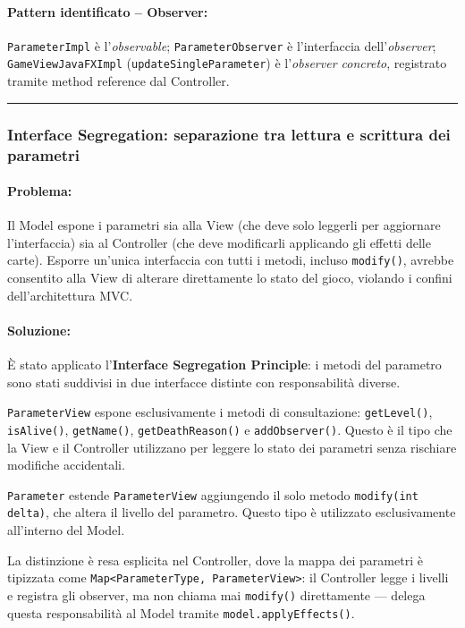 \documentclass[11pt, a4paper, oneside]{report}
\begin{document}
\paragraph{Pattern identificato -- Observer:}
\texttt{ParameterImpl} è l'\emph{observable}; \texttt{ParameterObserver}
è l'interfaccia dell'\emph{observer}; \texttt{GameViewJavaFXImpl}
(\texttt{updateSingleParameter}) è l'\emph{observer concreto}, registrato
tramite method reference dal Controller.

\bigskip\noindent\rule{\linewidth}{0.4pt}\bigskip

\bigskip
\subsubsection{Interface Segregation: separazione tra lettura e scrittura dei parametri}
\smallskip

\paragraph{Problema:}
Il Model espone i parametri sia alla View (che deve solo leggerli per
aggiornare l'interfaccia) sia al Controller (che deve modificarli
applicando gli effetti delle carte). Esporre un'unica interfaccia con
tutti i metodi, incluso \texttt{modify()}, avrebbe consentito alla View
di alterare direttamente lo stato del gioco, violando i confini
dell'architettura MVC.

\paragraph{Soluzione:}
È stato applicato l'\textbf{Interface Segregation Principle}: i metodi
del parametro sono stati suddivisi in due interfacce distinte con
responsabilità diverse.

\texttt{ParameterView} espone esclusivamente i metodi di consultazione:
\texttt{getLevel()}, \texttt{isAlive()}, \texttt{getName()},
\texttt{getDeathReason()} e \texttt{addObserver()}. Questo è il tipo
che la View e il Controller utilizzano per leggere lo stato dei parametri
senza rischiare modifiche accidentali.

\texttt{Parameter} estende \texttt{ParameterView} aggiungendo il solo
metodo \texttt{modify(int delta)}, che altera il livello del parametro.
Questo tipo è utilizzato esclusivamente all'interno del Model.

La distinzione è resa esplicita nel Controller, dove la mappa dei
parametri è tipizzata come \texttt{Map<ParameterType, ParameterView>}:
il Controller legge i livelli e registra gli observer, ma non chiama
mai \texttt{modify()} direttamente --- delega questa responsabilità
al Model tramite \texttt{model.applyEffects()}.
\end{document}
